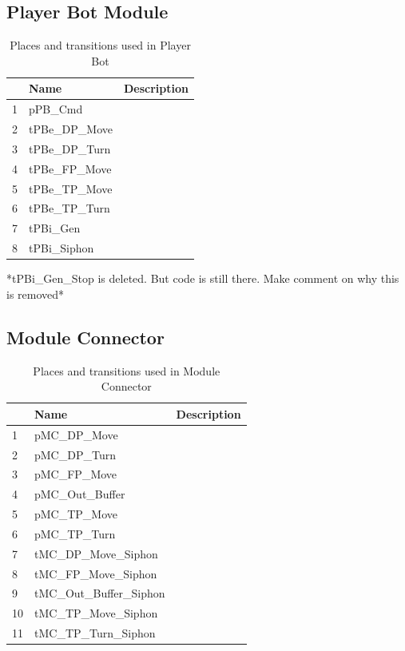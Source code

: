 \documentclass[runningheads,a4paper]{llncs}
\begin{document}
\subsection{Player Bot Module}
\begin{table}
	\caption{Places and transitions used in Player Bot}
	\begin{tabular}{|l|l|l|}
		\hline
		& Name & Description \\
		\hline
		1 & pPB\_Cmd          &  \\ \hline
		2 & tPBe\_DP\_Move    &  \\ \hline
		3 & tPBe\_DP\_Turn    &  \\ \hline
		4 & tPBe\_FP\_Move    &  \\ \hline
		5 & tPBe\_TP\_Move    &  \\ \hline
		6 & tPBe\_TP\_Turn    &  \\ \hline
		7 & tPBi\_Gen         &  \\ \hline
		8 & tPBi\_Siphon      &  \\ \hline
	\end{tabular}
\end{table}
*tPBi\_Gen\_Stop is deleted. But code is still there. Make comment on why this is removed*
\clearpage
\subsection{Module Connector}

\begin{table}
	\caption{Places and transitions used in Module Connector}
	\begin{tabular}{|l|l|l|}
		\hline
		& Name & Description \\
		\hline
		1 & pMC\_DP\_Move             &  \\ \hline
		2 & pMC\_DP\_Turn             &  \\ \hline
		3 & pMC\_FP\_Move             &  \\ \hline
		4 & pMC\_Out\_Buffer          &  \\ \hline
		5 & pMC\_TP\_Move             &  \\ \hline
		6 & pMC\_TP\_Turn             &  \\ \hline
		7 & tMC\_DP\_Move\_Siphon     &  \\ \hline
		8 & tMC\_FP\_Move\_Siphon     &  \\ \hline
		9 & tMC\_Out\_Buffer\_Siphon  &  \\ \hline
		10 & tMC\_TP\_Move\_Siphon     &  \\ \hline
		11 & tMC\_TP\_Turn\_Siphon     &  \\ \hline
	\end{tabular}
\end{table}
\clearpage
\end{document}
